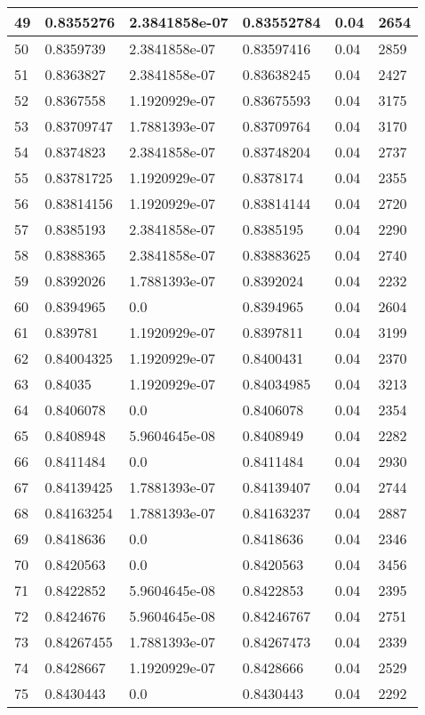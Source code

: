 \begin{longtable}{|l|l|l|l|l|l|}
49 & 0.8355276 & 2.3841858e-07 & 0.83552784 & 0.04 & 2654 \\ \hline 
50 & 0.8359739 & 2.3841858e-07 & 0.83597416 & 0.04 & 2859 \\ \hline 
51 & 0.8363827 & 2.3841858e-07 & 0.83638245 & 0.04 & 2427 \\ \hline 
52 & 0.8367558 & 1.1920929e-07 & 0.83675593 & 0.04 & 3175 \\ \hline 
53 & 0.83709747 & 1.7881393e-07 & 0.83709764 & 0.04 & 3170 \\ \hline 
54 & 0.8374823 & 2.3841858e-07 & 0.83748204 & 0.04 & 2737 \\ \hline 
55 & 0.83781725 & 1.1920929e-07 & 0.8378174 & 0.04 & 2355 \\ \hline 
56 & 0.83814156 & 1.1920929e-07 & 0.83814144 & 0.04 & 2720 \\ \hline 
57 & 0.8385193 & 2.3841858e-07 & 0.8385195 & 0.04 & 2290 \\ \hline 
58 & 0.8388365 & 2.3841858e-07 & 0.83883625 & 0.04 & 2740 \\ \hline 
59 & 0.8392026 & 1.7881393e-07 & 0.8392024 & 0.04 & 2232 \\ \hline 
60 & 0.8394965 & 0.0 & 0.8394965 & 0.04 & 2604 \\ \hline 
61 & 0.839781 & 1.1920929e-07 & 0.8397811 & 0.04 & 3199 \\ \hline 
62 & 0.84004325 & 1.1920929e-07 & 0.8400431 & 0.04 & 2370 \\ \hline 
63 & 0.84035 & 1.1920929e-07 & 0.84034985 & 0.04 & 3213 \\ \hline 
64 & 0.8406078 & 0.0 & 0.8406078 & 0.04 & 2354 \\ \hline 
65 & 0.8408948 & 5.9604645e-08 & 0.8408949 & 0.04 & 2282 \\ \hline 
66 & 0.8411484 & 0.0 & 0.8411484 & 0.04 & 2930 \\ \hline 
67 & 0.84139425 & 1.7881393e-07 & 0.84139407 & 0.04 & 2744 \\ \hline 
68 & 0.84163254 & 1.7881393e-07 & 0.84163237 & 0.04 & 2887 \\ \hline 
69 & 0.8418636 & 0.0 & 0.8418636 & 0.04 & 2346 \\ \hline 
70 & 0.8420563 & 0.0 & 0.8420563 & 0.04 & 3456 \\ \hline 
71 & 0.8422852 & 5.9604645e-08 & 0.8422853 & 0.04 & 2395 \\ \hline 
72 & 0.8424676 & 5.9604645e-08 & 0.84246767 & 0.04 & 2751 \\ \hline 
73 & 0.84267455 & 1.7881393e-07 & 0.84267473 & 0.04 & 2339 \\ \hline 
74 & 0.8428667 & 1.1920929e-07 & 0.8428666 & 0.04 & 2529 \\ \hline 
75 & 0.8430443 & 0.0 & 0.8430443 & 0.04 & 2292 \\ \hline 
\end{longtable}
